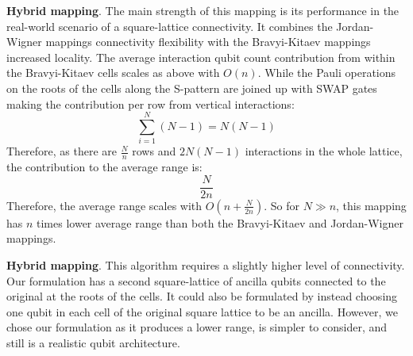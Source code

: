 \textbf {Hybrid mapping}.
The main strength of this mapping is its performance in the real-world scenario of a square-lattice connectivity. It combines the Jordan-Wigner mappings connectivity flexibility with the Bravyi-Kitaev mappings increased locality. The average interaction qubit count contribution from within the Bravyi-Kitaev cells scales as above with $O(n)$. While the Pauli operations on the roots of the cells along the S-pattern are joined up with SWAP gates making the contribution per row from vertical interactions:
\begin{equation}
        \sum_{i=1}^{N} (N-1) = N(N-1)
\end{equation}
Therefore, as there are $\frac{N}{n}$ rows and $2N(N-1)$ interactions in the whole lattice, the contribution to the average range is:
\begin{equation}
     \frac{N}{2n}
\end{equation}
Therefore, the average range scales with $O(n + \frac{N}{2n})$. So for $N \gg n$, this mapping has $n$ times lower average range than both the Bravyi-Kitaev and Jordan-Wigner mappings.

\textbf {Hybrid\+ mapping}.
This algorithm requires a slightly higher level of connectivity. Our formulation has a second square-lattice of ancilla qubits connected to the original at the roots of the cells. It could also be formulated by instead choosing one qubit in each cell of the original square lattice to be an ancilla. However, we chose our formulation as it produces a lower range, is simpler to consider, and still is a realistic qubit architecture.

